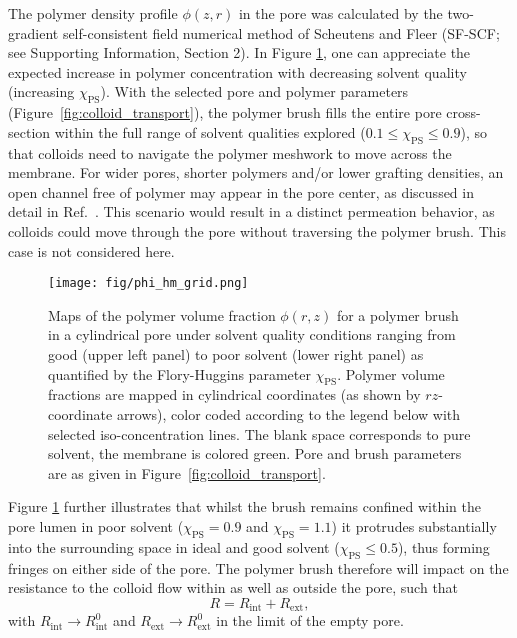 \documentclass[12pt, a4paper]{article}
\begin{document}
The polymer density profile $\phi(z,r)$ in the pore was calculated by the two-gradient self-consistent field numerical method of Scheutens and Fleer (SF-SCF; see Supporting Information, Section 2).
In Figure \ref{fig:phi_hm_grid}, one can appreciate the expected increase in polymer concentration with decreasing solvent quality (increasing $\chi_{\text{PS}}$).
With the selected pore and polymer parameters (Figure~\ref{fig:colloid_transport}), the polymer brush fills the entire pore cross-section within the full range of solvent qualities explored ($0.1\le\chi_{\text{PS}}\le0.9$), so that colloids need to navigate the polymer meshwork to move across the membrane.
For wider pores, shorter polymers and/or lower grafting densities, an open channel free of polymer may appear in the pore center, as discussed in detail in Ref.~\cite{Laktionov2021}.
This scenario would result in a distinct permeation behavior, as colloids could move through the pore without traversing the polymer brush.
This case is not considered here.

\begin{figure}
    \centering
    \texttt{[image: fig/phi\_hm\_grid.png]}
    \caption{
    Maps of the polymer volume fraction $\phi(r,z)$ for a polymer brush in a cylindrical pore under solvent quality conditions ranging from good (upper left panel) to poor solvent (lower right panel) as quantified by the Flory-Huggins parameter $\chi_{\text{PS}}$.
    Polymer volume fractions are mapped in cylindrical coordinates (as shown by $rz$-coordinate arrows), color coded according to the legend below with selected iso-concentration lines. The blank space corresponds to pure solvent, the membrane is colored green.
    Pore and brush parameters are as given in Figure~\ref{fig:colloid_transport}.
    }
    \label{fig:phi_hm_grid}
\end{figure}

Figure \ref{fig:phi_hm_grid} further illustrates that whilst the brush remains confined within the pore lumen in poor solvent ($\chi_{\text{PS}}=0.9$ and $\chi_{\text{PS}}=1.1$) it protrudes substantially into the surrounding space in ideal and good solvent ($\chi_{\text{PS}}\le0.5$), thus forming fringes on either side of the pore.
The polymer brush therefore will impact on the resistance to the colloid flow within as well as outside the pore, such that
\begin{equation}
    R=R_{\text{int}}+R_{\text{ext}},
    \label{eq:R_tot_tot}
\end{equation}
with $R_{\text{int}}\rightarrow R_{\text{int}}^{0}$ and $R_{\text{ext}}\rightarrow R_{\text{ext}}^{0}$ in the limit of the empty pore.
\end{document}
